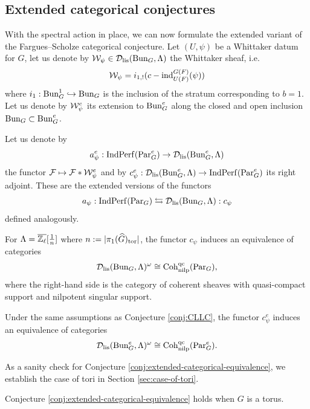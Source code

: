 \subsection{Extended categorical conjectures}

With the spectral action in place, we can now formulate the extended variant of the Fargues--Scholze categorical conjecture. Let $(U,\psi)$ be a Whittaker datum for $G$, let us denote by $\mathcal{W}_{\psi} \in \mathcal{D}_{\textnormal{lis}}(\mathrm{Bun}_{G},\Lambda)$ the Whittaker sheaf, i.e. 
$$\mathcal{W}_{\psi} = i_{1,!}(c-\mathrm{ind}_{U(F)}^{G(F)}(\psi))$$
where $i_1 : \mathrm{Bun}_G^1 \hookrightarrow \mathrm{Bun}_G$ is the inclusion of the stratum corresponding to $b = 1$. Let us denote by $\mathcal{W}_{\psi}^e$ its extension to $\mathrm{Bun}_G^e$ along the closed and open inclusion $\mathrm{Bun}_G \subset \mathrm{Bun}_G^e$.

Let us denote by 
$$a_{\psi}^e : \mathrm{Ind}\mathrm{Perf}(\mathrm{Par}_G^e) \to \mathcal{D}_{\textnormal{lis}}(\mathrm{Bun}_{G}^e,\Lambda)$$
the functor $\mathcal{F} \mapsto \mathcal{F} * \mathcal{W}_{\psi}^e$ and by $c_{\psi}^e : \mathcal{D}_{\textnormal{lis}}(\mathrm{Bun}_{G}^e,\Lambda) \to \mathrm{Ind}\mathrm{Perf}(\mathrm{Par}_G^{e})$ its right adjoint. These are the extended versions of the functors 
$$a_{\psi} : \mathrm{Ind}\mathrm{Perf}(\mathrm{Par}_G) \leftrightarrows \mathcal{D}_{\textnormal{lis}}(\mathrm{Bun}_{G},\Lambda) : c_{\psi}$$
defined analogously. 

\begin{conj}\label{conj:CLLC}
    For $\Lambda = \overline{\mathbb{Z}_{\ell}}[\frac{1}{n}]$ where $n := |\pi_{1}(\widehat{G})_{\textnormal{tor}}|$, the functor $c_{\psi}$ induces an equivalence of categories 
    $$\mathcal{D}_{\textnormal{lis}}(\mathrm{Bun}_{G},\Lambda)^{\omega} \cong \mathrm{Coh}_{\mathrm{nilp}}^{\textnormal{qc}}(\mathrm{Par}_G),$$
    where the right-hand side is the category of coherent sheaves with quasi-compact support and nilpotent singular support. 
\end{conj}

\begin{conj}\label{conj:extended-categorical-equivalence}
    Under the same assumptions as Conjecture \ref{conj:CLLC}, the functor $c_{\psi}^e$ induces an equivalence of categories 
    $$\mathcal{D}_{\textnormal{lis}}(\mathrm{Bun}_{G}^e,\Lambda)^{\omega} \cong \mathrm{Coh}_{\mathrm{nilp}}^{\textnormal{qc}}(\mathrm{Par}_G^e).$$
\end{conj}

As a sanity check for Conjecture \ref{conj:extended-categorical-equivalence}, we establish the case of tori in Section \ref{sec:case-of-tori}.

\begin{thm}\label{thm:case-of-tori}
    Conjecture \ref{conj:extended-categorical-equivalence} holds when $G$ is a torus.
\end{thm}

